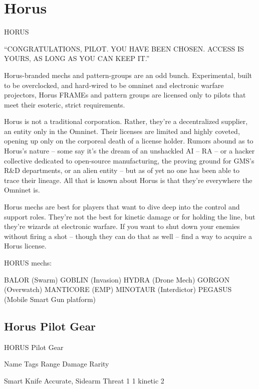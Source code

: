 \section{Horus}

   HORUS  

“CONGRATULATIONS, PILOT.   
YOU HAVE BEEN CHOSEN.   
ACCESS IS YOURS,   
AS LONG AS YOU CAN KEEP IT.”  

Horus-branded mechs and pattern-groups are an odd bunch. Experimental, built to be  
overclocked, and hard-wired to be omninet and electronic warfare projectors, Horus FRAMEs  
and pattern groups are licensed only to pilots that meet their esoteric, strict requirements. 
 

Horus is not a traditional corporation. Rather, they’re a decentralized supplier, an entity only in  
the Omninet. Their licenses are limited and highly coveted, opening up only on the corporeal  
death of a license holder. Rumors abound as to Horus’s nature -- some say it’s the dream of an  
unshackled AI -- RA -- or a hacker collective dedicated to open-source manufacturing, the  
proving ground for GMS’s R\&D departments, or an alien entity -- but as of yet no one has been  
able to trace their lineage. All that is known about Horus is that they’re everywhere the Omninet  
is. 
 

Horus mechs are best for players that want to dive deep into the control and support roles.  
They’re not the best for kinetic damage or for holding the line, but they’re wizards at electronic  
warfare. If you want to shut down your enemies without firing a shot -- though they can do that  
as well -- find a way to acquire a Horus license. 
 

HORUS mechs:  

BALOR (Swarm)  
GOBLIN (Invasion)  
HYDRA (Drone Mech)  
GORGON (Overwatch)  
MANTICORE (EMP)  
MINOTAUR (Interdictor)  
PEGASUS (Mobile Smart Gun platform)  

                                                                                                       
\subsection{Horus Pilot Gear}

                                          HORUS Pilot Gear  

 Name                   Tags                                   Range           Damage                Rarity 

 Smart Knife            Accurate, Sidearm                     Threat 1         1 kinetic              2 

